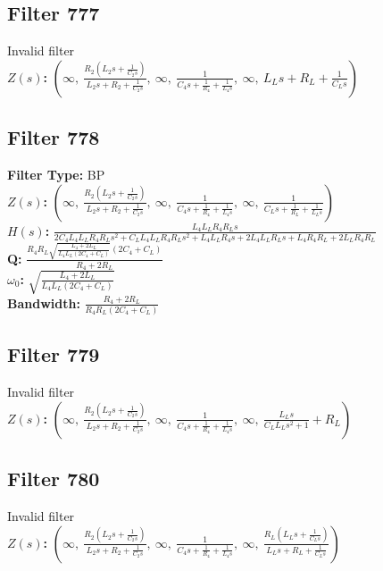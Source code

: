 \documentclass{article}
\begin{document}
\subsection*{Filter 777}
Invalid filter \\ 
\textbf{$Z(s)$:} $\left( \infty, \  \frac{R_{2} \left(L_{2} s + \frac{1}{C_{2} s}\right)}{L_{2} s + R_{2} + \frac{1}{C_{2} s}}, \  \infty, \  \frac{1}{C_{4} s + \frac{1}{R_{4}} + \frac{1}{L_{4} s}}, \  \infty, \  L_{L} s + R_{L} + \frac{1}{C_{L} s}\right)$ \\ 
\subsection*{Filter 778}
\textbf{Filter Type:} BP \\ 
\textbf{$Z(s)$:} $\left( \infty, \  \frac{R_{2} \left(L_{2} s + \frac{1}{C_{2} s}\right)}{L_{2} s + R_{2} + \frac{1}{C_{2} s}}, \  \infty, \  \frac{1}{C_{4} s + \frac{1}{R_{4}} + \frac{1}{L_{4} s}}, \  \infty, \  \frac{1}{C_{L} s + \frac{1}{R_{L}} + \frac{1}{L_{L} s}}\right)$ \\ 
\textbf{$H(s)$:} $\frac{L_{4} L_{L} R_{4} R_{L} s}{2 C_{4} L_{4} L_{L} R_{4} R_{L} s^{2} + C_{L} L_{4} L_{L} R_{4} R_{L} s^{2} + L_{4} L_{L} R_{4} s + 2 L_{4} L_{L} R_{L} s + L_{4} R_{4} R_{L} + 2 L_{L} R_{4} R_{L}}$ \\ 
\textbf{Q:} $\frac{R_{4} R_{L} \sqrt{\frac{L_{4} + 2 L_{L}}{L_{4} L_{L} \left(2 C_{4} + C_{L}\right)}} \left(2 C_{4} + C_{L}\right)}{R_{4} + 2 R_{L}}$ \\ 
\textbf{$\omega_0$:} $\sqrt{\frac{L_{4} + 2 L_{L}}{L_{4} L_{L} \left(2 C_{4} + C_{L}\right)}}$ \\ 
\textbf{Bandwidth:} $\frac{R_{4} + 2 R_{L}}{R_{4} R_{L} \left(2 C_{4} + C_{L}\right)}$ \\ 
\subsection*{Filter 779}
Invalid filter \\ 
\textbf{$Z(s)$:} $\left( \infty, \  \frac{R_{2} \left(L_{2} s + \frac{1}{C_{2} s}\right)}{L_{2} s + R_{2} + \frac{1}{C_{2} s}}, \  \infty, \  \frac{1}{C_{4} s + \frac{1}{R_{4}} + \frac{1}{L_{4} s}}, \  \infty, \  \frac{L_{L} s}{C_{L} L_{L} s^{2} + 1} + R_{L}\right)$ \\ 
\subsection*{Filter 780}
Invalid filter \\ 
\textbf{$Z(s)$:} $\left( \infty, \  \frac{R_{2} \left(L_{2} s + \frac{1}{C_{2} s}\right)}{L_{2} s + R_{2} + \frac{1}{C_{2} s}}, \  \infty, \  \frac{1}{C_{4} s + \frac{1}{R_{4}} + \frac{1}{L_{4} s}}, \  \infty, \  \frac{R_{L} \left(L_{L} s + \frac{1}{C_{L} s}\right)}{L_{L} s + R_{L} + \frac{1}{C_{L} s}}\right)$ \\ 
\end{document}
